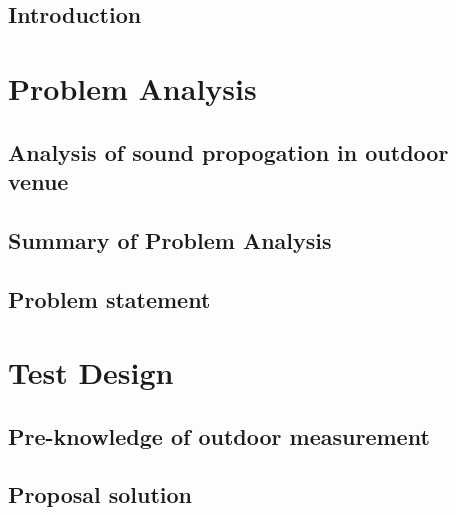 \glsresetall


\graphicspath{{figures/analysis/}}
\chapter{Introduction}\label{ch:intro}



\part{Problem Analysis}\label{pt:analysis} \glsresetall
\graphicspath{{figures/analysis/}}


\chapter{Analysis of sound propogation in outdoor venue}\label{ch:analysis}




\chapter{Summary of Problem Analysis}\label{ch:analysis:summary}


\chapter{Problem statement}\label{ch:statement}




\part{Test Design}\label{pt:design} 
\graphicspath{{figures/design/}}	


\chapter{Pre-knowledge of outdoor measurement}


\chapter{Proposal solution}


